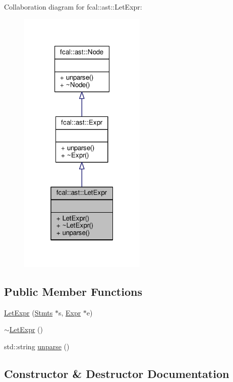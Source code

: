Collaboration diagram for fcal\+:\+:ast\+:\+:Let\+Expr\+:
\nopagebreak
\begin{figure}[H]
\begin{center}
\leavevmode
\includegraphics[width=172pt]{classfcal_1_1ast_1_1LetExpr__coll__graph}
\end{center}
\end{figure}
\subsection*{Public Member Functions}
\begin{DoxyCompactItemize}
\item 
\hyperlink{classfcal_1_1ast_1_1LetExpr_a80c27eae6fb75b185b0e386ab8bd0984}{Let\+Expr} (\hyperlink{classfcal_1_1ast_1_1Stmts}{Stmts} $\ast$s, \hyperlink{classfcal_1_1ast_1_1Expr}{Expr} $\ast$e)
\item 
\hyperlink{classfcal_1_1ast_1_1LetExpr_a9cc61f08fead1f71d0590904ac6bb0af}{$\sim$\+Let\+Expr} ()
\item 
std\+::string \hyperlink{classfcal_1_1ast_1_1LetExpr_a5277bbe3510e870f65dd9158592ef6da}{unparse} ()
\end{DoxyCompactItemize}


\subsection{Constructor \& Destructor Documentation}
